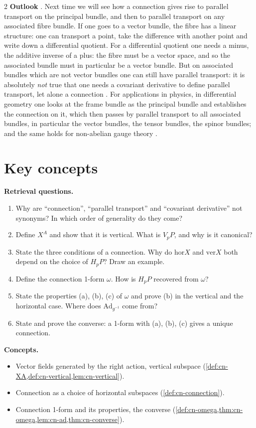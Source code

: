 \begin{paracol}{2}
\textbf{Outlook}  . Next time we will see how a connection gives rise to parallel transport on the principal bundle, and then to parallel transport on any associated fibre bundle. If one goes to a vector bundle, the fibre has a linear structure: one can transport a point, take the difference with another point and write down a differential quotient. For a differential quotient one needs a minus, the additive inverse of a plus: the fibre must be a vector space, and so the associated bundle must in particular be a vector bundle. But on associated bundles which are not vector bundles one can still have parallel transport: it is absolutely \emph{not} true that one needs a covariant derivative to define parallel transport, let alone a connection  . For applications in physics, in differential geometry one looks at the frame bundle as the principal bundle and establishes the connection on it, which then passes by parallel transport to all associated bundles, in particular the vector bundles, the tensor bundles, the spinor bundles; and the same holds for non-abelian gauge theory  .

\section*{Key concepts}
\begin{keyconcepts}
\textbf{Retrieval questions.}
\begin{enumerate}
  \item Why are ``connection'', ``parallel transport'' and ``covariant derivative'' not synonyms? In which order of generality do they come?
  \item Define $X^A$ and show that it is vertical. What is $V_pP$, and why is it canonical?
  \item State the three conditions of a connection. Why do $\mathrm{hor}X$ and $\mathrm{ver}X$ both depend on the choice of $H_pP$? Draw an example.
  \item Define the connection 1-form $\omega$. How is $H_pP$ recovered from $\omega$?
  \item State the properties (a), (b), (c) of $\omega$ and prove (b) in the vertical and the horizontal case. Where does $\mathrm{Ad}_{g^{-1}}$ come from?
  \item State and prove the converse: a 1-form with (a), (b), (c) gives a unique connection.
\end{enumerate}
\textbf{Concepts.}
\begin{itemize}
  \item Vector fields generated by the right action, vertical subspace (\cref{def:cn-XA,def:cn-vertical,lem:cn-vertical}).
  \item Connection as a choice of horizontal subspaces (\cref{def:cn-connection}).
  \item Connection 1-form and its properties, the converse (\cref{def:cn-omega,thm:cn-omega,lem:cn-ad,thm:cn-converse}).
\end{itemize}
\end{keyconcepts}

\flushside
\end{paracol}
